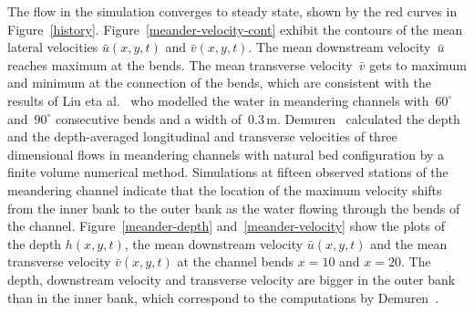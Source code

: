 \documentclass[twocolumn]{afmc_art}
\newcommand{\uu}{{\bar u}}
\newcommand{\vv}{{\bar v}}
\begin{document}
The flow in the simulation converges to steady state, shown by the red curves in Figure~\ref{history}.
Figure~\ref{meander-velocity-cont} exhibit the contours of the mean lateral velocities $\uu(x,y,t)$ and $\vv(x,y,t)$. 
The mean downstream velocity~$\uu$ reaches maximum at the bends.
The mean transverse velocity~$\vv$ gets to maximum and minimum at the connection of the bends, which are consistent with the results of Liu eta al.~\cite{Liu2009} who modelled the water in meandering channels with~$60^\circ$ and~$90^\circ$ consecutive bends and a width of~$0.3$\,m.
Demuren~\cite{Demuren1993} calculated the depth and the depth-averaged longitudinal and transverse velocities of three dimensional flows in meandering channels with natural bed configuration by a finite volume numerical method. 
Simulations at fifteen observed stations of the meandering channel indicate that the location of the maximum velocity shifts from the inner bank to the outer bank as the water flowing through the bends of the channel. 
Figure~\ref{meander-depth} and~\ref{meander-velocity} show the plots of the depth $h(x,y,t)$, the mean downstream velocity $\uu(x,y,t)$ and the mean transverse velocity $\vv(x,y,t)$ at the channel bends $x=10$ and $x=20$.
The depth, downstream velocity and transverse velocity are bigger in the outer bank than in the inner bank, which correspond to the computations by Demuren~\cite{Demuren1993}. 
\end{document}
